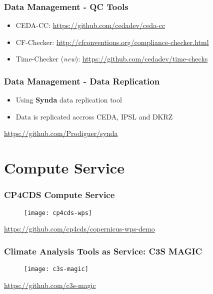 \documentclass{beamer}
\begin{document}
\begin{frame}
\frametitle<presentation>{Data Management - QC Tools}
  \begin{itemize}
    \item CEDA-CC: \url{https://github.com/cedadev/ceda-cc}
    \item CF-Checker: \url{http://cfconventions.org/compliance-checker.html}
    \item Time-Checker (\emph{new}): \url{https://github.com/cedadev/time-checks}
  \end{itemize}

\end{frame}

\begin{frame}
\frametitle<presentation>{Data Management - Data Replication}
  \begin{itemize}
    \item Using {\bf Synda} data replication tool
    \item Data is replicated accross CEDA, IPSL and DKRZ
  \end{itemize}

  \centering
  \footnotesize{\url{https://github.com/Prodiguer/synda}}

\end{frame}


\section{Compute Service}

\begin{frame}
\frametitle<presentation>{CP4CDS Compute Service}

  \begin{figure}[ht]
    \centering
    \texttt{[image: cp4cds-wps]}
  \end{figure}

  \centering
  \footnotesize{\url{https://github.com/cp4cds/copernicus-wps-demo}}

\end{frame}

\begin{frame}
\frametitle<presentation>{Climate Analysis Tools as Service: C3S MAGIC}

  \begin{figure}[ht]
    \centering
    \texttt{[image: c3s-magic]}
  \end{figure}

  \centering
  \footnotesize{\url{https://github.com/c3s-magic}}

\end{frame}
\end{document}
